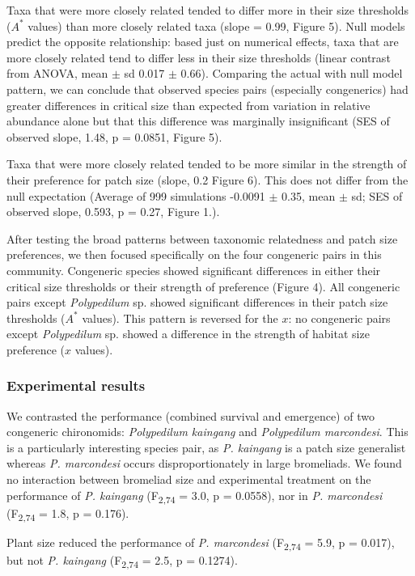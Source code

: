 Taxa that were more closely related tended to differ more in their size
thresholds (\(A^{*}\) values) than more closely related taxa (slope =
0.99, Figure 5). Null models predict the opposite relationship: based
just on numerical effects, taxa that are more closely related tend to
differ less in their size thresholds (linear contrast from ANOVA, mean $\pm$
sd 0.017 $\pm$ 0.66). Comparing the actual with null model pattern, we can
conclude that observed species pairs (especially congenerics) had
greater differences in critical size than expected from variation in
relative abundance alone but that this difference was marginally
insignificant (SES of observed slope, 1.48, p = 0.0851, Figure 5).

Taxa that were more closely related tended to be more similar in the
strength of their preference for patch size (slope, 0.2 Figure 6).
This does not differ from the null expectation (Average of 999
simulations -0.0091 $\pm$ 0.35, mean $\pm$ sd; SES of observed slope, 0.593, p =
0.27, Figure 1.).

After testing the broad patterns between taxonomic relatedness and
patch size preferences, we then focused specifically on the four
congeneric pairs in this community. Congeneric species showed
significant differences in either their critical size thresholds or
their strength of preference (Figure 4). All congeneric pairs except
\emph{Polypedilum} sp. showed significant differences in their patch
size thresholds (\(A^{*}\) values). This pattern is reversed for the
$x$: no congeneric pairs except
\emph{Polypedilum} sp. showed a difference in the strength of habitat
size preference (\(x\) values).

\subsubsection{Experimental results}\label{experimental-results}

We contrasted the performance (combined survival and emergence) of two
congeneric chironomids: \emph{Polypedilum kaingang} and
\emph{Polypedilum marcondesi}. This is a particularly interesting
species pair, as \emph{P. kaingang} is a patch size generalist whereas
\emph{P. marcondesi} occurs disproportionately in large bromeliads. We
found no interaction between bromeliad size and experimental treatment
on the performance of \emph{P. kaingang} (F\textsubscript{2,74} = 3.0, p
= 0.0558), nor in \emph{P. marcondesi} (F\textsubscript{2,74} = 1.8, p =
0.176).

Plant size reduced the performance of \emph{P. marcondesi}
(F\textsubscript{2,74} = 5.9, p = 0.017), but not \emph{P. kaingang}
(F\textsubscript{2,74} = 2.5, p = 0.1274).

